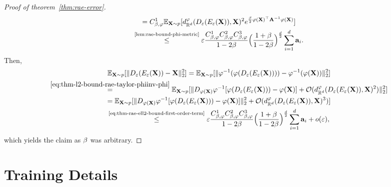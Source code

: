 \begin{proof}[Proof of theorem~\ref{thm:rae-error}]
\begin{multline}
        = C^1_{\beta,\varphi} \mathbb{E}_{\mathbf{X} \sim p}[ d_{\mathbb{R}^{d}}^\varphi (D_\varepsilon(E_\varepsilon(\mathbf{X})), \mathbf{X})^2 e^{\frac{\beta}{2} \varphi(\mathbf{X})^\top \mathbf{A}^{-1} \varphi(\mathbf{X})}]\\
        \overset{\text{\ref{lem:rae-bound-phi-metric}}}{\leq} \varepsilon  \frac{C^1_{\beta,\varphi} C^2_{\beta,\varphi} C^3_{\beta,\varphi}}{1 - 2\beta} \Bigl(\frac{1 + \beta}{1 - 2\beta} \Bigr)^{\frac{d}{2}}  \sum_{i=1}^{d} \mathbf{a}_{i}.
        \label{eq:thm-rae-ell2-bound-first-order-term}
    \end{multline}
    Then, 
    \begin{multline}
        \mathbb{E}_{\mathbf{X} \sim p}[\| D_\varepsilon(E_\varepsilon(\mathbf{X}))-  \mathbf{X}\|_2^2] = \mathbb{E}_{\mathbf{X} \sim p}[\| \varphi^{-1}(\varphi( D_\varepsilon(E_\varepsilon(\mathbf{X})) ))-  \varphi^{-1}(\varphi(\mathbf{X}))\|_2^2] \\
        \overset{\ref{eq:thm-l2-bound-rae-taylor-phiinv-phi}}{=} \mathbb{E}_{\mathbf{X} \sim p}[\|D_{\varphi(\mathbf{X})} \varphi^{-1} [\varphi(D_\varepsilon(E_\varepsilon(\mathbf{X}))) - \varphi(\mathbf{X})]  + \mathcal{O}(d_{\mathbb{R}^{d}}^\varphi(D_\varepsilon(E_\varepsilon(\mathbf{X})),\mathbf{X})^2)\|_2^2] \\
        = \mathbb{E}_{\mathbf{X} \sim p}[\|D_{\varphi(\mathbf{X})} \varphi^{-1} [\varphi(D_\varepsilon(E_\varepsilon(\mathbf{X}))) - \varphi(\mathbf{X})]\|_2^2 + \mathcal{O}(d_{\mathbb{R}^{d}}^\varphi(D_\varepsilon(E_\varepsilon(\mathbf{X})),\mathbf{X})^3)]\\
        \overset{\text{\ref{eq:thm-rae-ell2-bound-first-order-term}}}{\leq} \varepsilon  \frac{C^1_{\beta,\varphi} C^2_{\beta,\varphi} C^3_{\beta,\varphi}}{1 - 2\beta} \Bigl(\frac{1 + \beta}{1 - 2\beta} \Bigr)^{\frac{d}{2}}  \sum_{i=1}^{d} \mathbf{a}_{i} + o(\varepsilon),
    \end{multline}
    which yields the claim as $\beta$ was arbitrary. 
\end{proof}

\section{Training Details}
\label{app:training_details}

